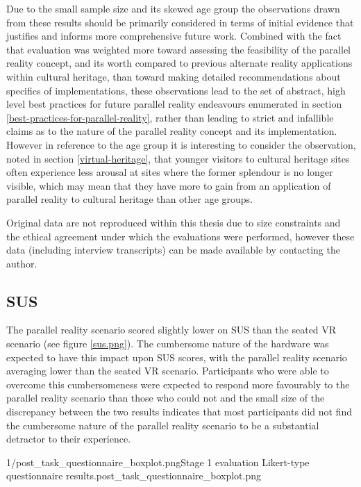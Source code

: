 Due to the small sample size and its skewed age group the observations drawn from these results should be primarily considered in terms of initial evidence that justifies and informs more comprehensive future work. Combined with the fact that evaluation was weighted more toward assessing the feasibility of the parallel reality concept, and its worth compared to previous alternate reality applications within cultural heritage, than toward making detailed recommendations about specifics of implementations, these observations lead to the set of abstract, high level best practices for future parallel reality endeavours enumerated in section \ref{best-practices-for-parallel-reality}, rather than leading to strict and infallible claims as to the nature of the parallel reality concept and its implementation. However in reference to the age group it is interesting to consider the observation, noted in section \ref{virtual-heritage}, that younger visitors to cultural heritage sites often experience less arousal at sites where the former splendour is no longer visible, which may mean that they have more to gain from an application of parallel reality to cultural heritage than other age groups.

Original data are not reproduced within this thesis due to size constraints and the ethical agreement under which the evaluations were performed, however these data (including interview transcripts) can be made available by contacting the author.


\subsection{SUS}
The parallel reality scenario scored slightly lower on SUS than the seated VR scenario (see figure \ref{sus.png}). The cumbersome nature of the hardware was expected to have this impact upon SUS scores, with the parallel reality scenario averaging lower than the seated VR scenario. Participants who were able to overcome this cumbersomeness were expected to respond more favourably to the parallel reality scenario than those who could not and the small size of the discrepancy between the two results indicates that most participants did not find the cumbersome nature of the parallel reality scenario to be a substantial detractor to their experience.

       {1/post_task_questionnaire_boxplot.png}{Stage 1 evaluation Likert-type questionnaire results.}{post_task_questionnaire_boxplot.png}


